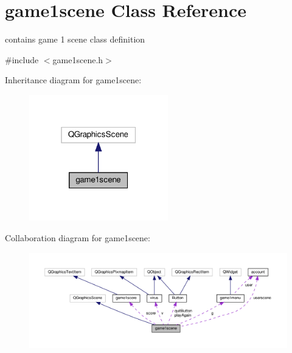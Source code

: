 \hypertarget{classgame1scene}{}\section{game1scene Class Reference}
\label{classgame1scene}


contains game 1 scene class definition  




{\ttfamily \#include $<$game1scene.\+h$>$}



Inheritance diagram for game1scene\+:\nopagebreak
\begin{figure}[H]
\begin{center}
\leavevmode
\includegraphics[width=171pt]{classgame1scene__inherit__graph}
\end{center}
\end{figure}


Collaboration diagram for game1scene\+:\nopagebreak
\begin{figure}[H]
\begin{center}
\leavevmode
\includegraphics[width=350pt]{classgame1scene__coll__graph}
\end{center}
\end{figure}
